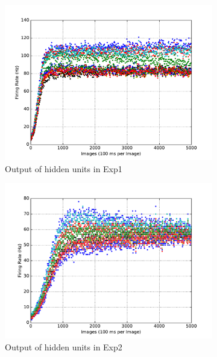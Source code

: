 \begin{figure}
\begin{subfigure}[t]{0.4\textwidth}
		\includegraphics[width=\textwidth]{pics_sdlm/07_exp_SAE_all_long/exp1_hid_s.pdf}
		\caption{Output of hidden units in Exp1}
	\end{subfigure}
	\begin{subfigure}[t]{0.4\textwidth}
		\includegraphics[width=\textwidth]{pics_sdlm/07_exp_SAE_all_long/exp2_hid_s.pdf}
		\caption{Output of hidden units in Exp2}
	\end{subfigure}\\
	\begin{subfigure}[t]{0.4\textwidth}

\end{subfigure}
\end{figure}
